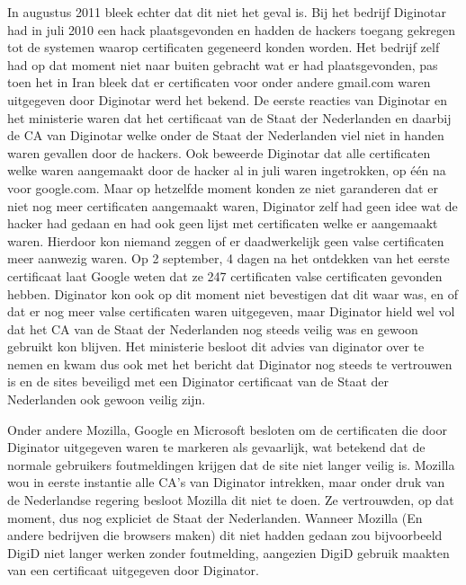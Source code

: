 In augustus 2011 bleek echter dat dit niet het geval is\cite{bib.webwereld.diginotar1}. Bij het bedrijf Diginotar had in juli 2010 een hack plaatsgevonden en hadden de hackers toegang gekregen tot de systemen waarop certificaten gegeneerd konden worden. Het bedrijf zelf had op dat moment niet naar buiten gebracht wat er had plaatsgevonden, pas toen het in Iran bleek dat er certificaten voor onder andere gmail.com waren uitgegeven door Diginotar werd het bekend. De eerste reacties van Diginotar en het ministerie waren dat het certificaat van de Staat der Nederlanden en daarbij de CA van Diginotar welke onder de Staat der Nederlanden viel niet in handen waren gevallen door de hackers. Ook beweerde Diginotar dat alle certificaten welke waren aangemaakt door de hacker al in juli waren ingetrokken, op \'{e}\'{e}n na voor google.com\cite{bib.webwereld.diginotar2}. Maar op hetzelfde moment konden ze niet garanderen dat er niet nog meer certificaten aangemaakt waren, Diginator zelf had geen idee wat de hacker had gedaan en had ook geen lijst met certificaten welke er aangemaakt waren. Hierdoor kon niemand zeggen of er daadwerkelijk geen valse certificaten meer aanwezig waren. Op 2 september, 4 dagen na het ontdekken van het eerste certificaat laat Google weten dat ze 247 certificaten valse certificaten gevonden hebben\cite{bib.webwereld.diginator3}. Diginator kon ook op dit moment niet bevestigen dat dit waar was, en of dat er nog meer valse certificaten waren uitgegeven, maar Diginator hield wel vol dat het CA van de Staat der Nederlanden nog steeds veilig was en gewoon gebruikt kon blijven. Het ministerie besloot dit advies van diginator over te nemen en kwam dus ook met het bericht dat Diginator nog steeds te vertrouwen is en de sites beveiligd met een Diginator certificaat van de Staat der Nederlanden ook gewoon veilig zijn.

Onder andere Mozilla, Google en Microsoft besloten om de certificaten die door Diginator uitgegeven waren te markeren als gevaarlijk, wat betekend dat de normale gebruikers foutmeldingen krijgen dat de site niet langer veilig is. Mozilla wou in eerste instantie alle CA's van Diginator intrekken, maar onder druk van de Nederlandse regering besloot Mozilla dit niet te doen. Ze vertrouwden, op dat moment, dus nog expliciet de Staat der Nederlanden. Wanneer Mozilla (En andere bedrijven die browsers maken) dit niet hadden gedaan zou bijvoorbeeld DigiD niet langer werken zonder foutmelding, aangezien DigiD gebruik maakten van een certificaat uitgegeven door Diginator.

